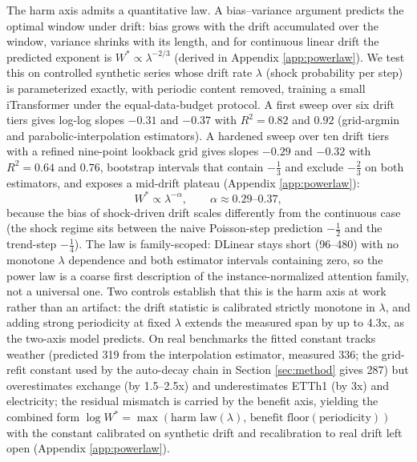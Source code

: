 The harm axis admits a quantitative law. A bias--variance argument predicts the optimal window under drift: bias grows with the drift accumulated over the window, variance shrinks with its length, and for continuous linear drift the predicted exponent is $W^* \propto \lambda^{-2/3}$ (derived in Appendix \ref{app:powerlaw}). We test this on controlled synthetic series whose drift rate $\lambda$ (shock probability per step) is parameterized exactly, with periodic content removed, training a small iTransformer under the equal-data-budget protocol. A first sweep over six drift tiers gives log-log slopes $-0.31$ and $-0.37$ with $R^2 = 0.82$ and $0.92$ (grid-argmin and parabolic-interpolation estimators). A hardened sweep over ten drift tiers with a refined nine-point lookback grid gives slopes $-0.29$ and $-0.32$ with $R^2 = 0.64$ and $0.76$, bootstrap intervals that contain $-\tfrac13$ and exclude $-\tfrac23$ on both estimators, and exposes a mid-drift plateau (Appendix \ref{app:powerlaw}):
\begin{equation}
W^* \propto \lambda^{-\alpha}, \qquad \alpha \approx 0.29\text{--}0.37,
\label{eq:law}
\end{equation}
because the bias of shock-driven drift scales differently from the continuous case (the shock regime sits between the naive Poisson-step prediction $-\tfrac12$ and the trend-step $-\tfrac14$). The law is family-scoped: DLinear stays short (96--480) with no monotone $\lambda$ dependence and both estimator intervals containing zero, so the power law is a coarse first description of the instance-normalized attention family, not a universal one. Two controls establish that this is the harm axis at work rather than an artifact: the drift statistic is calibrated strictly monotone in $\lambda$, and adding strong periodicity at fixed $\lambda$ extends the measured span by up to 4.3x, as the two-axis model predicts. On real benchmarks the fitted constant tracks weather (predicted 319 from the interpolation estimator, measured 336; the grid-refit constant used by the auto-decay chain in Section \ref{sec:method} gives 287) but overestimates exchange (by 1.5--2.5x) and underestimates ETTh1 (by 3x) and electricity; the residual mismatch is carried by the benefit axis, yielding the combined form $\log W^* = \max(\text{harm law}(\lambda),\, \text{benefit floor}(\text{periodicity}))$ with the constant calibrated on synthetic drift and recalibration to real drift left open (Appendix \ref{app:powerlaw}).


